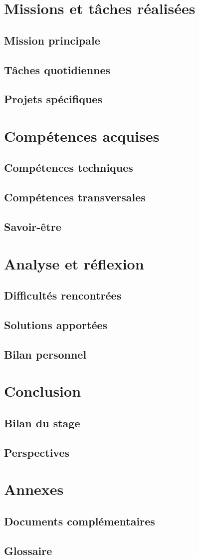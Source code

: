 \documentclass[12pt,a4paper]{report}
\begin{document}
\chapter{Missions et tâches réalisées}
\section{Mission principale}
\section{Tâches quotidiennes}
\section{Projets spécifiques}

\chapter{Compétences acquises}
\section{Compétences techniques}
\section{Compétences transversales}
\section{Savoir-être}

\chapter{Analyse et réflexion}
\section{Difficultés rencontrées}
\section{Solutions apportées}
\section{Bilan personnel}

\chapter{Conclusion}
\section{Bilan du stage}
\section{Perspectives}




\appendix
\chapter{Annexes}
\section{Documents complémentaires}
\section{Glossaire}
\end{document}
